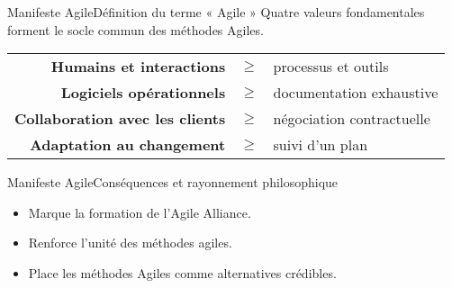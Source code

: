 {

    \begin{frame}{Manifeste Agile}{Définition du terme « Agile »}
        Quatre valeurs fondamentales forment le socle commun des méthodes Agiles.

        \vspace{1em}
        \begin{tabular}{rcl}
            \textbf{Humains et interactions}&$\geqslant$&processus et outils\\
            \textbf{Logiciels opérationnels}&$\geqslant$&documentation exhaustive\\
            \textbf{Collaboration avec les clients}&$\geqslant$&négociation contractuelle\\
            \textbf{Adaptation au changement}&$\geqslant$&suivi d’un plan
        \end{tabular}
    \end{frame}
}

\begin{frame}{Manifeste Agile}{Conséquences et rayonnement philosophique}
    \begin{itemize}
        \item Marque la formation de l'Agile Alliance.
        \item Renforce l'unité des méthodes agiles.
        \item Place les méthodes Agiles comme alternatives crédibles.
    \end{itemize}
\end{frame}
